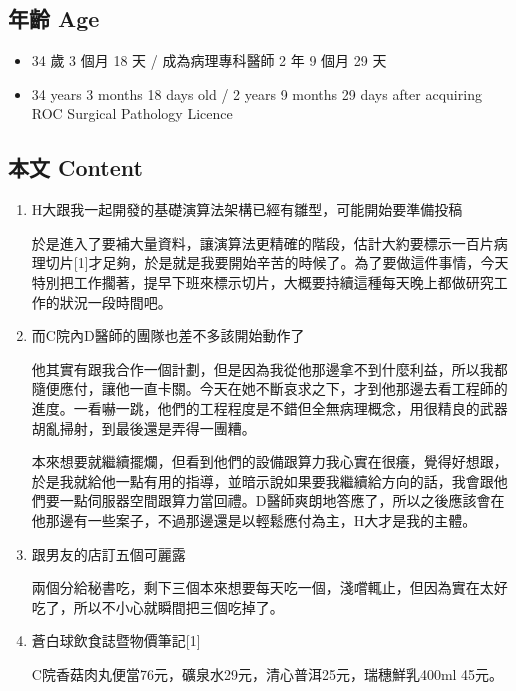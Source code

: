 \documentclass[a5paper, 11pt
]{book}
\providecommand{\tightlist}{%
  \setlength{\itemsep}{0pt}\setlength{\parskip}{0pt}}
\begin{document}
\hypertarget{ux5e74ux9f61-age-70}{%
\subsection{年齡 Age}\label{ux5e74ux9f61-age-70}}

\begin{itemize}
\tightlist
\item
  34 歲 3 個月 18 天 / 成為病理專科醫師 2 年 9 個月 29 天
\item
  34 years 3 months 18 days old / 2 years 9 months 29 days after
  acquiring ROC Surgical Pathology Licence
\end{itemize}

\hypertarget{ux672cux6587-content-70}{%
\subsection{本文 Content}\label{ux672cux6587-content-70}}

\begin{enumerate}
\def\labelenumi{\arabic{enumi}.}
\item
  H大跟我一起開發的基礎演算法架構已經有雛型，可能開始要準備投稿

  於是進入了要補大量資料，讓演算法更精確的階段，估計大約要標示一百片病理切片{[}1{]}才足夠，於是就是我要開始辛苦的時候了。為了要做這件事情，今天特別把工作擱著，提早下班來標示切片，大概要持續這種每天晚上都做研究工作的狀況一段時間吧。
\item
  而C院內D醫師的團隊也差不多該開始動作了

  他其實有跟我合作一個計劃，但是因為我從他那邊拿不到什麼利益，所以我都隨便應付，讓他一直卡關。今天在她不斷哀求之下，才到他那邊去看工程師的進度。一看嚇一跳，他們的工程程度是不錯但全無病理概念，用很精良的武器胡亂掃射，到最後還是弄得一團糟。

  本來想要就繼續擺爛，但看到他們的設備跟算力我心實在很癢，覺得好想跟，於是我就給他一點有用的指導，並暗示說如果要我繼續給方向的話，我會跟他們要一點伺服器空間跟算力當回禮。D醫師爽朗地答應了，所以之後應該會在他那邊有一些案子，不過那邊還是以輕鬆應付為主，H大才是我的主體。
\item
  跟男友的店訂五個可麗露

  兩個分給秘書吃，剩下三個本來想要每天吃一個，淺嚐輒止，但因為實在太好吃了，所以不小心就瞬間把三個吃掉了。
\item
  蒼白球飲食誌暨物價筆記{[}1{]}

  C院香菇肉丸便當76元，礦泉水29元，清心普洱25元，瑞穗鮮乳400ml 45元。
\end{enumerate}
\end{document}
